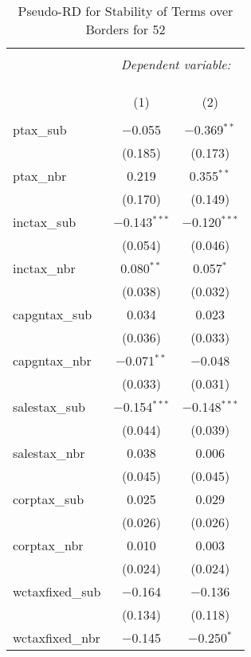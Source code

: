 
\begin{table}[!htbp] \centering 
  \caption{Pseudo-RD for Stability of Terms over Borders for  52} 
  \label{} 
\begin{tabular}{@{\extracolsep{5pt}}lcc} 
\\[-1.8ex]\hline 
\hline \\[-1.8ex] 
 & \multicolumn{2}{c}{\textit{Dependent variable:}} \\ 
\cline{2-3} 
\\[-1.8ex] & \multicolumn{2}{c}{ } \\ 
\\[-1.8ex] & (1) & (2)\\ 
\hline \\[-1.8ex] 
 ptax\_sub & $-$0.055 & $-$0.369$^{**}$ \\ 
  & (0.185) & (0.173) \\ 
  ptax\_nbr & 0.219 & 0.355$^{**}$ \\ 
  & (0.170) & (0.149) \\ 
  inctax\_sub & $-$0.143$^{***}$ & $-$0.120$^{***}$ \\ 
  & (0.054) & (0.046) \\ 
  inctax\_nbr & 0.080$^{**}$ & 0.057$^{*}$ \\ 
  & (0.038) & (0.032) \\ 
  capgntax\_sub & 0.034 & 0.023 \\ 
  & (0.036) & (0.033) \\ 
  capgntax\_nbr & $-$0.071$^{**}$ & $-$0.048 \\ 
  & (0.033) & (0.031) \\ 
  salestax\_sub & $-$0.154$^{***}$ & $-$0.148$^{***}$ \\ 
  & (0.044) & (0.039) \\ 
  salestax\_nbr & 0.038 & 0.006 \\ 
  & (0.045) & (0.045) \\ 
  corptax\_sub & 0.025 & 0.029 \\ 
  & (0.026) & (0.026) \\ 
  corptax\_nbr & 0.010 & 0.003 \\ 
  & (0.024) & (0.024) \\ 
  wctaxfixed\_sub & $-$0.164 & $-$0.136 \\ 
  & (0.134) & (0.118) \\ 
  wctaxfixed\_nbr & $-$0.145 & $-$0.250$^{*}$ \\ 

\end{tabular}
\end{table}
